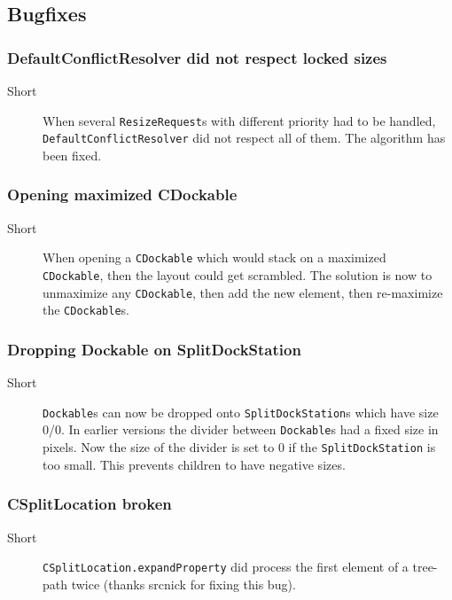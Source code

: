 \documentclass[a4paper,10pt]{article}
\newcommand{\src}[1]{\lstinline[basicstyle=\normalsize\ttfamily,keywordstyle=\normalsize\ttfamily,identifierstyle=\normalsize\ttfamily]|#1|}
\newcommand{\short}{\item[Short]}
\begin{document}
\subsection{Bugfixes}

\subsubsection{DefaultConflictResolver did not respect locked sizes}
\begin{description}
 \short When several \src{ResizeRequest}s with different priority had to be handled, \src{DefaultConflictResolver} did not respect all of them. The algorithm has been fixed.
\end{description}

\subsubsection{Opening maximized CDockable}
\begin{description}
 \short When opening a \src{CDockable} which would stack on a maximized \\\src{CDockable}, then the layout could get scrambled. The solution is now to unmaximize any \src{CDockable}, then add the new element, then re-maximize the \src{CDockable}s.
\end{description}

\subsubsection{Dropping Dockable on SplitDockStation}
\begin{description}
 \short \src{Dockable}s can now be dropped onto \src{SplitDockStation}s which have size 0/0. In earlier versions the divider between \src{Dockable}s had a fixed size in pixels. Now the size of the divider is set to 0 if the \src{SplitDockStation} is too small. This prevents children to have negative sizes.
\end{description}

\subsubsection{CSplitLocation broken}
\begin{description}
 \short \src{CSplitLocation.expandProperty} did process the first element of a tree-path twice (thanks srcnick for fixing this bug).
\end{description}
\end{document}
